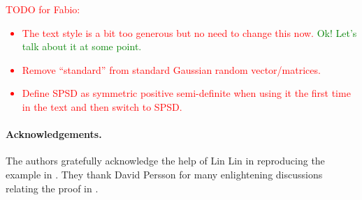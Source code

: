 \documentclass[11pt]{article}
\begin{document}
\textcolor{red}{TODO for Fabio:
\begin{itemize}
 \item The text style is a bit too generous but no need to change this now. \textcolor{green}{Ok! Let's talk about it at some point.}
 \item Remove ``standard'' from standard Gaussian random vector/matrices.
 \item Define SPSD as symmetric positive semi-definite when using it the first time in the text and then switch to SPSD.
\end{itemize}
}
\color{blue}








%
\paragraph{Acknowledgements.} The authors gratefully acknowledge the help of Lin Lin in reproducing the example in . They thank David Persson for many enlightening discussions relating the proof in .

\printbibliography


\end{document}
